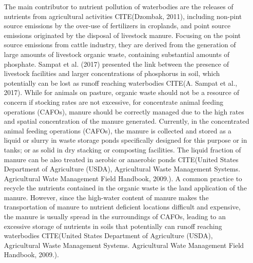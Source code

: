 \documentclass[10pt,a4paper]{article}
\begin{document}
The main contributor to nutrient pollution of waterbodies are the releases of nutrients from agricultural activities CITE(Dzombak, 2011), including non-pint source emissions by the over-use of fertilizers in croplands, and point source emissions originated by the disposal of livestock manure. Focusing on the point source emissions from cattle industry, they are derived from the generation of large amounts of livestock organic waste, containing substantial amounts of phosphate. Sampat et al. (2017) presented the link between the presence of livestock facilities and larger concentrations of phosphorus in soil, which potentially can be lost as runoff reaching waterbodies CITE(A. Sampat et al., 2017). While for animals on pasture, organic waste should not be a resource of concern if stocking rates are not excessive, for concentrate animal feeding operations (CAFOs), manure should be correctly managed due to the high rates and spatial concentration of the manure generated. Currently, in the concentrated animal feeding operations (CAFOs), the manure is collected and stored as a liquid or slurry in waste storage ponds specifically designed for this purpose or in tanks; or as solid in dry stacking or composting facilities. The liquid fraction of manure can be also treated in aerobic or anaerobic ponds CITE(United States Department of Agriculture (USDA), Agricultural Waste Management Systems. Agricultural Wate Management Field Handbook, 2009.). A common practice to recycle the nutrients contained in the organic waste is the land application of the manure. However, since the high-water content of manure makes the transportation of manure to nutrient deficient locations difficult and expensive, the manure is usually spread in the surroundings of CAFOs, leading to an excessive storage of nutrients in soils that potentially can runoff reaching waterbodies CITE(United States Department of Agriculture (USDA), Agricultural Waste Management Systems. Agricultural Wate Management Field Handbook, 2009.). 

\end{document}

